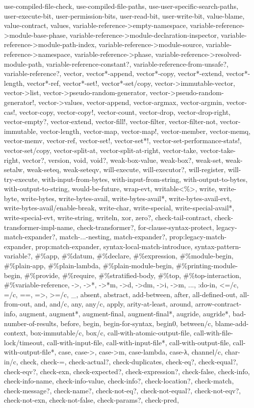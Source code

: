 {{use-compiled-file-check, use-compiled-file-paths, use-user-specific-search-paths, user-execute-bit, user-permission-bits, user-read-bit, user-write-bit, value-blame, value-contract, values, variable-reference->empty-namespace, variable-reference->module-base-phase, variable-reference->module-declaration-inspector, variable-reference->module-path-index, variable-reference->module-source, variable-reference->namespace, variable-reference->phase, variable-reference->resolved-module-path, variable-reference-constant?, variable-reference-from-unsafe?, variable-reference?, vector, vector*-append, vector*-copy, vector*-extend, vector*-length, vector*-ref, vector*-set!, vector*-set/copy, vector->immutable-vector, vector->list, vector->pseudo-random-generator, vector->pseudo-random-generator!, vector->values, vector-append, vector-argmax, vector-argmin, vector-cas!, vector-copy, vector-copy!, vector-count, vector-drop, vector-drop-right, vector-empty?, vector-extend, vector-fill!, vector-filter, vector-filter-not, vector-immutable, vector-length, vector-map, vector-map!, vector-member, vector-memq, vector-memv, vector-ref, vector-set!, vector-set*!, vector-set-performance-stats!, vector-set/copy, vector-split-at, vector-split-at-right, vector-take, vector-take-right, vector?, version, void, void?, weak-box-value, weak-box?, weak-set, weak-setalw, weak-seteq, weak-seteqv, will-execute, will-executor?, will-register, will-try-execute, with-input-from-bytes, with-input-from-string, with-output-to-bytes, with-output-to-string, would-be-future, wrap-evt, writable<\%>, write, write-byte, write-bytes, write-bytes-avail, write-bytes-avail*, write-bytes-avail-evt, write-bytes-avail/enable-break, write-char, write-special, write-special-avail*, write-special-evt, write-string, writeln, xor, zero?, check-tail-contract, check-transformer-impl-name, check-transformer?, for-clause-syntax-protect, legacy-match-expander?, match-...-nesting, match-expander?, prop:legacy-match-expander, prop:match-expander, syntax-local-match-introduce, syntax-pattern-variable?, \#\%app, \#\%datum, \#\%declare, \#\%expression, \#\%module-begin, \#\%plain-app, \#\%plain-lambda, \#\%plain-module-begin, \#\%printing-module-begin, \#\%provide, \#\%require, \#\%stratified-body, \#\%top, \#\%top-interaction, \#\%variable-reference, ->, ->*, ->*m, ->d, ->dm, ->i, ->m, ..., :do-in, <=/c, =/c, ==, =>, >=/c, _, absent, abstract, add-between, after, all-defined-out, all-from-out, and, and/c, any, any/c, apply, arity-at-least, around, arrow-contract-info, augment, augment*, augment-final, augment-final*, augride, augride*, bad-number-of-results, before, begin, begin-for-syntax, begin0, between/c, blame-add-context, box-immutable/c, box/c, call-with-atomic-output-file, call-with-file-lock/timeout, call-with-input-file, call-with-input-file*, call-with-output-file, call-with-output-file*, case, case->, case->m, case-lambda, case-λ, channel/c, char-in/c, check, check-=, check-actual?, check-duplicates, check-eq?, check-equal?, check-eqv?, check-exn, check-expected?, check-expression?, check-false, check-info, check-info-name, check-info-value, check-info?, check-location?, check-match, check-message?, check-name?, check-not-eq?, check-not-equal?, check-not-eqv?, check-not-exn, check-not-false, check-params?, check-pred, }}
